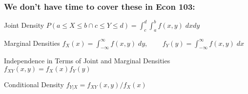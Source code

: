 %
%
\begin{frame}
  \frametitle{We don't have time to cover these in Econ 103:}

\begin{block}{Joint Density}
$ \displaystyle P(a\leq X \leq b \cap c\leq Y \leq d) = \int_c^d \int_a^b f(x,y) \; dxdy$
\end{block}
\begin{block}{Marginal Densities}
$f_X(x) = \int_{-\infty}^\infty f(x,y)\; dy$, $\;\;\;\;\;\;\; f_Y(y) = \int_{-\infty}^\infty f(x,y)\; dx$
\end{block}
\begin{block}{Independence in Terms of Joint and Marginal Densities}
$f_{XY}(x,y) = f_X(x)f_Y(y)$
\end{block}
\begin{block}{Conditional Density}
$f_{Y|X} = f_{XY}(x,y)/f_X(x)$
\end{block}

\end{frame}

